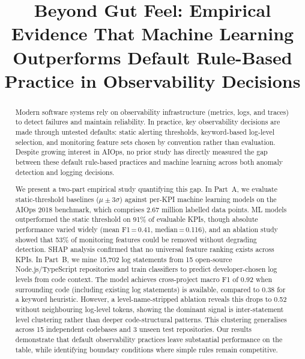 \documentclass[10pt,twocolumn]{article}
\title{Beyond Gut Feel: Empirical Evidence That Machine Learning\\Outperforms Default Rule-Based Practice in Observability Decisions}
\author{
}
\date{}
\begin{document}
\maketitle

\begin{abstract}
Modern software systems rely on observability infrastructure (metrics, logs, and traces) to detect failures and maintain reliability. In practice, key observability decisions are made through untested defaults: static alerting thresholds, keyword-based log-level selection, and monitoring feature sets chosen by convention rather than evaluation. Despite growing interest in AIOps, no prior study has directly measured the gap between these default rule-based practices and machine learning across both anomaly detection and logging decisions.

We present a two-part empirical study quantifying this gap. In Part~A, we evaluate static-threshold baselines ($\mu \pm 3\sigma$) against per-KPI machine learning models on the AIOps 2018 benchmark, which comprises 2.67 million labelled data points. ML models outperformed the static threshold on 91\% of evaluable KPIs, though absolute performance varied widely (mean F1\,=\,0.41, median\,=\,0.116), and an ablation study showed that 53\% of monitoring features could be removed without degrading detection. SHAP analysis confirmed that no universal feature ranking exists across KPIs. In Part~B, we mine 15,702 log statements from 15 open-source Node.js/TypeScript repositories and train classifiers to predict developer-chosen log levels from code context. The model achieves cross-project macro F1 of 0.92 when surrounding code (including existing log statements) is available, compared to 0.38 for a keyword heuristic. However, a level-name-stripped ablation reveals this drops to 0.52 without neighbouring log-level tokens, showing the dominant signal is inter-statement level clustering rather than deeper code-structural patterns. This clustering generalises across 15 independent codebases and 3 unseen test repositories. Our results demonstrate that default observability practices leave substantial performance on the table, while identifying boundary conditions where simple rules remain competitive.
\end{abstract}

\end{document}
